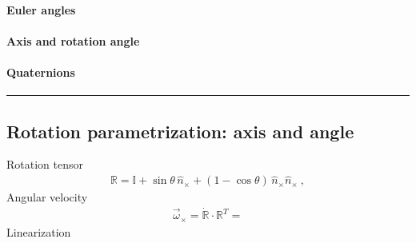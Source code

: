 \documentclass[letterpaper,10pt,english]{jupyterBook}
\begin{document}
\paragraph{Euler angles}
\label{\detokenize{ch/kinematics-rotations-tensors:euler-angles}}\label{\detokenize{ch/kinematics-rotations-tensors:classical-mechanics-kinematics-rotations-param-euler}}

\paragraph{Axis and rotation angle}
\label{\detokenize{ch/kinematics-rotations-tensors:axis-and-rotation-angle}}\label{\detokenize{ch/kinematics-rotations-tensors:classical-mechanics-kinematics-rotations-param-axis}}

\paragraph{Quaternions}
\label{\detokenize{ch/kinematics-rotations-tensors:quaternions}}\label{\detokenize{ch/kinematics-rotations-tensors:classical-mechanics-kinematics-rotations-param-quaternions}}

\bigskip\hrule\bigskip


\sphinxstepscope


\subsection{Rotation parametrization: axis and angle}
\label{\detokenize{ch/kinematics-rotations-param-axis-angle:rotation-parametrization-axis-and-angle}}\label{\detokenize{ch/kinematics-rotations-param-axis-angle:classical-mechanics-kinematics-rotations-axis-angle}}\label{\detokenize{ch/kinematics-rotations-param-axis-angle::doc}}
\sphinxAtStartPar
Rotation tensor
\begin{equation}\label{equation:ch/kinematics-rotations-param-axis-angle:eq:R:aa}
\begin{split}\mathbb{R} = \mathbb{I} + \sin \theta \, \hat{n}_\times + ( 1 - \cos \theta ) \, \hat{n}_\times \hat{n}_\times \ ,\end{split}
\end{equation}
\sphinxAtStartPar
Angular velocity
\begin{equation*}
\begin{split}\vec{\omega}_\times = \dot{\mathbb{R}} \cdot \mathbb{R}^T = \end{split}
\end{equation*}
\sphinxAtStartPar
Linearization
\end{document}
